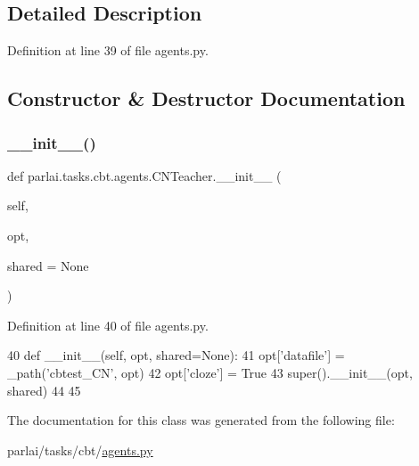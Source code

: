 \subsection{Detailed Description}


Definition at line 39 of file agents.\+py.



\subsection{Constructor \& Destructor Documentation}
\mbox{\label{classparlai_1_1tasks_1_1cbt_1_1agents_1_1CNTeacher_a68b96e17407acfb0c7583b2da47a1f51}} 
\subsubsection{\texorpdfstring{\+\_\+\+\_\+init\+\_\+\+\_\+()}{\_\_init\_\_()}}
{\footnotesize\ttfamily def parlai.\+tasks.\+cbt.\+agents.\+C\+N\+Teacher.\+\_\+\+\_\+init\+\_\+\+\_\+ (\begin{DoxyParamCaption}\item[{}]{self,  }\item[{}]{opt,  }\item[{}]{shared = {\ttfamily None} }\end{DoxyParamCaption})}



Definition at line 40 of file agents.\+py.


\begin{DoxyCode}
40     \textcolor{keyword}{def }\_\_init\_\_(self, opt, shared=None):
41         opt[\textcolor{stringliteral}{'datafile'}] = \_path(\textcolor{stringliteral}{'cbtest\_CN'}, opt)
42         opt[\textcolor{stringliteral}{'cloze'}] = \textcolor{keyword}{True}
43         super().\_\_init\_\_(opt, shared)
44 
45 
\end{DoxyCode}


The documentation for this class was generated from the following file\+:\begin{DoxyCompactItemize}
\item 
parlai/tasks/cbt/\hyperlink{parlai_2tasks_2cbt_2agents_8py}{agents.\+py}\end{DoxyCompactItemize}
